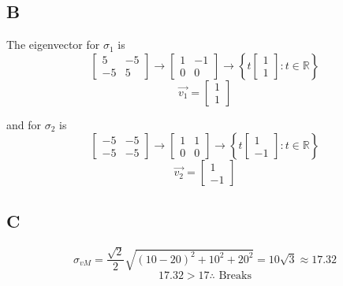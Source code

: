 \documentclass{article}
\begin{document}
\subsection*{B}
The eigenvector for \(\sigma_1\) is
\[
	\begin{bmatrix}
		5  & -5 \\
		-5 & 5
	\end{bmatrix}
	\rightarrow
	\begin{bmatrix}
		1 & -1 \\
		0 & 0
	\end{bmatrix}
	\rightarrow
	\left \{ t \begin{bmatrix}
		1 \\
		1
	\end{bmatrix}: t \in \mathbb{R}
	\right \}
\]
\[
	\vec{v_1}= \begin{bmatrix}
		1 \\
		1
	\end{bmatrix}
\]

and for \(\sigma_2\) is
\[
	\begin{bmatrix}
		-5 & -5 \\
		-5 & -5
	\end{bmatrix}
	\rightarrow
	\begin{bmatrix}
		1 & 1 \\
		0 & 0
	\end{bmatrix}
	\rightarrow
	\left \{ t \begin{bmatrix}
		1 \\
		-1
	\end{bmatrix} : t \in \mathbb{R}
	\right \}
\]
\[
	\vec{v_2}= \begin{bmatrix}
		1 \\
		-1
	\end{bmatrix}
\]

\subsection*{C}
\[
	\sigma_{vM} = \frac{\sqrt{2}}{2} \sqrt{(10-20)^2 + 10^2 + 20^2} = 10 \sqrt{3} \approx 17.32
\]
\[
	17.32 > 17 \therefore \text{ Breaks}
\]
\end{document}
